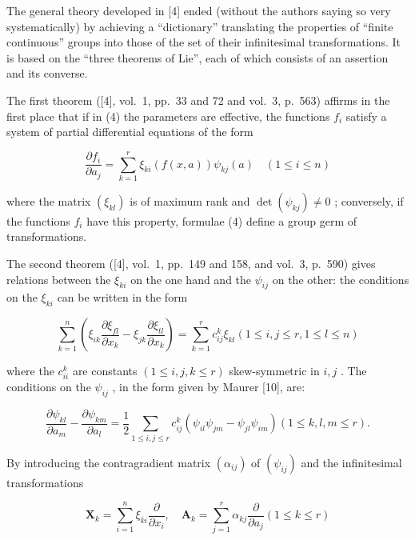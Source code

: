 The general theory developed in {[}4{]} ended (without the authors saying so very systematically) by achieving a ``dictionary'' translating the properties of ``finite continuous'' groups into those of the set of their infinitesimal transformations. It is based on the ``three theorems of Lie'', each of which consists of an assertion and its converse.

The first theorem ({[}4{]}, vol.~1, pp.~33 and 72 and vol.~3, p.~563) affirms in the first place that if in (4) the parameters are effective, the functions \(f_{i}\) satisfy a system of partial differential equations of the form

\[
\frac {\partial f _ {i}}{\partial a _ {j}} = \sum_ {k = 1} ^ {r} \xi_ {k i} (f (x, a)) \psi_ {k j} (a) \quad (1 \leqslant i \leqslant n)\tag{15}
\]

where the matrix \((\xi_{kl})\) is of maximum rank and \(\det(\psi_{kj}) \neq 0\) ; conversely, if the functions \(f_{i}\) have this property, formulae (4) define a group germ of transformations.

The second theorem ({[}4{]}, vol.~1, pp.~149 and 158, and vol.~3, p.~590) gives relations between the \(\xi_{ki}\) on the one hand and the \(\psi_{ij}\) on the other: the conditions on the \(\xi_{ki}\) can be written in the form

\[
\sum_ {k = 1} ^ {n} \left(\xi_ {i k} \frac {\partial \xi_ {f l}}{\partial x _ {k}} - \xi_ {j k} \frac {\partial \xi_ {t l}}{\partial x _ {k}}\right) = \sum_ {k = 1} ^ {r} c _ {i j} ^ {k} \xi_ {k l} (1 \leqslant i, j \leqslant r, 1 \leqslant l \leqslant n)\tag{16}
\]

where the \(c_{ii}^{k}\) are constants \((1\leqslant i,j,k\leqslant r)\) skew-symmetric in \(i,j\) . The conditions on the \(\psi_{ij}\) , in the form given by Maurer {[}10{]}, are:

\[
\frac {\partial \psi_ {k l}}{\partial a _ {m}} - \frac {\partial \psi_ {k m}}{\partial a _ {l}} = \frac {1}{2} \sum_ {1 \leqslant i, j \leqslant r} c _ {i j} ^ {k} (\psi_ {i l} \psi_ {j m} - \psi_ {j l} \psi_ {i m}) (1 \leqslant k, l, m \leqslant r).\tag{17}
\]

By introducing the contragradient matrix \((\alpha_{ij})\) of \((\psi_{ij})\) and the infinitesimal transformations

\[
\mathbf {X} _ {k} = \sum_ {i = 1} ^ {n} \xi_ {k i} \frac {\partial}{\partial x _ {i}}, \quad \mathbf {A} _ {k} = \sum_ {j = 1} ^ {r} \alpha_ {k j} \frac {\partial}{\partial a _ {j}} (1 \leqslant k \leqslant r)\tag{18}
\]

